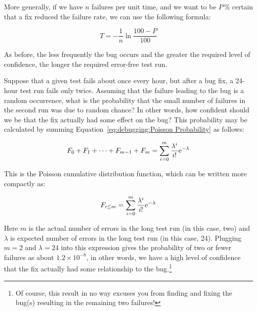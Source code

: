 More generally, if we have $n$ failures per unit time, and we want to
be $P$\,\% certain that a fix reduced the failure rate, we can use the
following formula:

\begin{equation}
	T = - \frac{1}{n} \ln \frac{100 - P}{100}
\label{eq:debugging:Error-Free Test Duration}
\end{equation}

\QuickQuizEnd

As before, the less frequently the bug occurs and the greater the
required level of confidence, the longer the required error-free test run.

Suppose that a given test fails about once every hour, but after a bug
fix, a 24-hour test run fails only twice.
Assuming that the failure leading to the bug is a random occurrence,
what is the probability that the small number of
failures in the second run was due to random chance?
In other words, how confident should we be that the fix actually
had some effect on the bug?
This probability may be calculated by summing
Equation~\ref{eq:debugging:Poisson Probability} as follows:

\begin{equation}
	F_0 + F_1 + \dots + F_{m - 1} + F_m =
		\sum_{i=0}^m \frac{\lambda^i}{i!} \mathrm{e}^{-\lambda}
\end{equation}

This is the Poisson cumulative distribution function, which can be
written more compactly as:

\begin{equation}
	F_{i \le m} = \sum_{i=0}^m \frac{\lambda^i}{i!} \mathrm{e}^{-\lambda}
\label{eq:debugging:Possion CDF}
\end{equation}

Here $m$ is the actual number of errors in the long test run
(in this case, two) and $\lambda$ is expected number of errors
in the long test run (in this case, 24).
Plugging $m=2$ and $\lambda=24$ into this expression gives the probability
of two or fewer failures as about
$1.2 \times 10^{-8}$, in other words, we have a high level of confidence
that the fix actually had some relationship to the bug.\footnote{
	Of course, this result in no way excuses you from finding and
	fixing the bug(s) resulting in the remaining two failures!}

